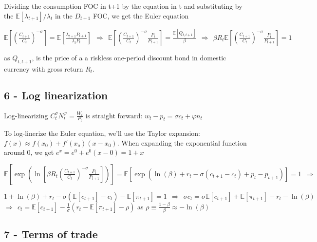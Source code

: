 \documentclass[
]{article}
\begin{document}
Dividing the consumption FOC in t+1 by the equation in t and
substituting by the \(\mathbb{E}[\lambda_{t+1}]/\lambda_t\) in the
\(D_{t+1}\) FOC, we get the Euler equation

\(\displaystyle \mathbb{E} \left[ \left( \frac{C_{t+1}}{C_t} \right)^{-\sigma} \right] = \mathbb{E} \left[ \frac{\lambda_{t+1} P_{t+1}}{\lambda_t P_t} \right] \ \ \Rightarrow \ \  \mathbb{E} \left[ \left( \frac{C_{t+1}}{C_t} \right)^{-\sigma} \frac{P_t}{P_{t+1}}\right]= \frac{\mathbb{E}[Q_{t,t+1}]}{\beta} \ \ \Rightarrow \ \ \beta R_t \mathbb{E} \left[ \left( \frac{C_{t+1}}{C_t} \right)^{-\sigma} \frac{P_t}{P_{t+1}}\right]= 1\)

as \(Q_{t,t+1}\), is the price of a a riskless one-period discount bond
in domestic currency with gross return \(R_t\).

\hypertarget{log-linearization}{%
\subsection{6 - Log linearization}\label{log-linearization}}

Log-linearizing
\(\displaystyle C_t^{\sigma}N_t^{\varphi} = \frac{W_t}{P_t}\) is
straight forward: \(w_t - p_t = \sigma c_t + \varphi n_t\)

To log-linerize the Euler equation, we'll use the Taylor expansion:
\(f(x) \approx f(x_0) + f'(x_o)(x-x_0)\). When expanding the exponential
function around 0, we get \(e^x=e^0+e^0(x-0)=1+x\)

\(\mathbb{E} \left[ \exp \left( \ln \left[ \beta R_t \left( \frac{C_{t+1}}{C_t} \right)^{-\sigma} \frac{P_t}{P_{t+1}} \right] \right) \right] = \mathbb{E} \left[ \exp \left( \ln(\beta) + r_t -\sigma(c_{t+1}-c_t) + p_t - p_{t+1} \right) \right] = 1 \ \ \Rightarrow\)

\(\displaystyle 1 + \ln(\beta) + r_t -\sigma(\mathbb{E} \left[c_{t+1} \right]-c_t) - \mathbb{E} \left[ \pi_{t+1} \right] = 1 \ \ \Rightarrow \ \ \sigma c_t = \sigma \mathbb{E} \left[c_{t+1} \right] + \mathbb{E} \left[ \pi_{t+1} \right] - r_t - \ln(\beta)\)
\(\displaystyle \Rightarrow \ \ c_t = \mathbb{E} \left[c_{t+1} \right] -\frac{1}{\sigma} \left( r_t - \mathbb{E} \left[ \pi_{t+1} \right] -\rho\right)\)
as \(\rho \equiv \frac{1-\beta}{\beta} \approx -\ln(\beta)\)

\hypertarget{terms-of-trade}{%
\subsection{7 - Terms of trade}\label{terms-of-trade}}
\end{document}
